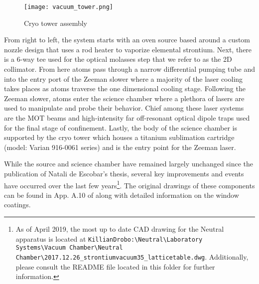 	\begin{figure} 
		\centerline{
		\texttt{[image: vacuum\_tower.png]}}
		\caption{Cryo tower assembly}
		\label{fig:cryoTower}
	\end{figure}
From right to left, the system starts with an oven source based around a custom nozzle design that uses a rod heater to vaporize elemental strontium.
Next, there is a 6-way tee used for the optical molasses step that we refer to as the 2D collimator. 
From here atoms pass through a narrow differential pumping tube and into the entry port of the Zeeman slower where a majority of the laser cooling takes places as atoms traverse the one dimensional cooling stage. 
Following the Zeeman slower, atoms enter the science chamber where a plethora of lasers are used to manipulate and probe their behavior.
Chief among these laser systems are the MOT beams and high-intensity far off-resonant optical dipole traps used for the final stage of confinement.
Lastly, the body of the science chamber is supported by the cryo tower which houses a titanium sublimation cartridge (model: Varian 916-0061 series) and is the entry point for the Zeeman laser.

While the source and science chamber have remained largely unchanged since the publication of Natali de Escobar's thesis, several key improvements and events have occurred over the last few years\footnote{As of April 2019, the most up to date CAD drawing for the Neutral apparatus is located at \texttt{KillianDrobo:\textbackslash Neutral\textbackslash Laboratory Systems\textbackslash Vacuum Chamber\textbackslash Neutral Chamber\textbackslash 2017.12.26\_strontiumvacuum35\_latticetable.dwg}. Additionally, please consult the README file located in this folder for further information.}.
The original drawings of these components can be found in App. A.10 of \cite{MartinezdeEscolar2010} along with detailed information on the window coatings.





